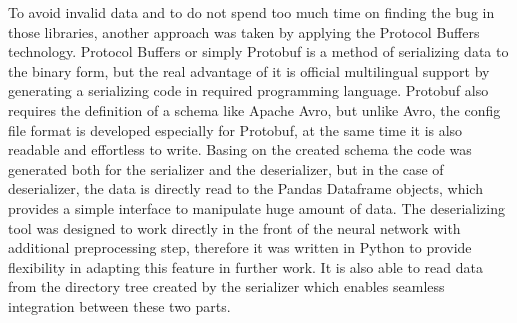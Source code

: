 To avoid invalid data and to do not spend too much time on finding the bug in those libraries, another approach was taken by applying the Protocol Buffers technology.
Protocol Buffers or simply Protobuf is a method of serializing data to the binary form, but the real advantage of it is official multilingual support by generating a serializing code in required programming language.
Protobuf also requires the definition of a schema like Apache Avro, but unlike Avro, the config file format is developed especially for Protobuf, at the same time it is also readable and effortless to write.
Basing on the created schema the code was generated both for the serializer and the deserializer, but in the case of deserializer, the data is directly read to the Pandas Dataframe objects, which provides a simple interface to manipulate huge amount of data.
The deserializing tool was designed to work directly in the front of the neural network with additional preprocessing step, therefore it was written in Python to provide flexibility in adapting this feature in further work.
It is also able to read data from the directory tree created by the serializer which enables seamless integration between these two parts.